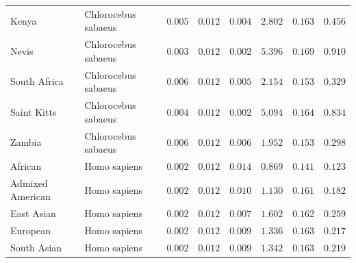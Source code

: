 \documentclass{article}
\begin{document}
\begin{center}
\begin{longtable*}{|l|l|r|r|r|r|r|r|}
             Kenya & Chlorocebus sabaeus &               $ 0.005$ &              $ 0.012$ &              $ 0.004$ &                                          $ 2.802$ &                         $ 0.163$ &                      $ 0.456$ \\
             Nevis & Chlorocebus sabaeus &               $ 0.003$ &              $ 0.012$ &              $ 0.002$ &                                          $ 5.396$ &                         $ 0.169$ &                      $ 0.910$ \\
             South Africa & Chlorocebus sabaeus &               $ 0.006$ &              $ 0.012$ &              $ 0.005$ &                                          $ 2.154$ &                         $ 0.153$ &                      $ 0.329$ \\
             Saint Kitts & Chlorocebus sabaeus &               $ 0.004$ &              $ 0.012$ &              $ 0.002$ &                                          $ 5.094$ &                         $ 0.164$ &                      $ 0.834$ \\
             Zambia & Chlorocebus sabaeus &               $ 0.006$ &              $ 0.012$ &              $ 0.006$ &                                          $ 1.952$ &                         $ 0.153$ &                      $ 0.298$ \\
            African &        Homo sapiens &               $ 0.002$ &              $ 0.012$ &              $ 0.014$ &                                          $ 0.869$ &                         $ 0.141$ &                      $ 0.123$ \\
            Admixed American &        Homo sapiens &               $ 0.002$ &              $ 0.012$ &              $ 0.010$ &                                          $ 1.130$ &                         $ 0.161$ &                      $ 0.182$ \\
            East Asian &        Homo sapiens &               $ 0.002$ &              $ 0.012$ &              $ 0.007$ &                                          $ 1.602$ &                         $ 0.162$ &                      $ 0.259$ \\
            European &        Homo sapiens &               $ 0.002$ &              $ 0.012$ &              $ 0.009$ &                                          $ 1.336$ &                         $ 0.163$ &                      $ 0.217$ \\
            South Asian &        Homo sapiens &               $ 0.002$ &              $ 0.012$ &              $ 0.009$ &                                          $ 1.342$ &                         $ 0.163$ &                      $ 0.219$ \\
        \end{longtable*}
    \end{center}
\end{document}

